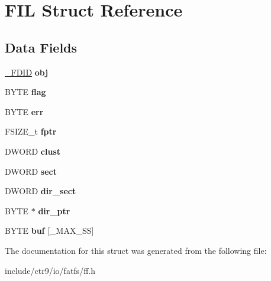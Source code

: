 \hypertarget{struct_f_i_l}{}\section{F\+IL Struct Reference}
\label{struct_f_i_l}
\subsection*{Data Fields}
\begin{DoxyCompactItemize}
\item 
\hyperlink{struct___f_d_i_d}{\+\_\+\+F\+D\+ID} {\bfseries obj}\hypertarget{struct_f_i_l_ae7242545ea88ea2602484122ebe65fa3}{}\label{struct_f_i_l_ae7242545ea88ea2602484122ebe65fa3}

\item 
B\+Y\+TE {\bfseries flag}\hypertarget{struct_f_i_l_ac409508881f5a16f2998ae675072b376}{}\label{struct_f_i_l_ac409508881f5a16f2998ae675072b376}

\item 
B\+Y\+TE {\bfseries err}\hypertarget{struct_f_i_l_aea440945db26de9c4a88065c0c887fda}{}\label{struct_f_i_l_aea440945db26de9c4a88065c0c887fda}

\item 
F\+S\+I\+Z\+E\+\_\+t {\bfseries fptr}\hypertarget{struct_f_i_l_a088b03ab2e02f82e10e17bdd938190a6}{}\label{struct_f_i_l_a088b03ab2e02f82e10e17bdd938190a6}

\item 
D\+W\+O\+RD {\bfseries clust}\hypertarget{struct_f_i_l_aa41312aba551b9a6d1c9d3c8c7d2734b}{}\label{struct_f_i_l_aa41312aba551b9a6d1c9d3c8c7d2734b}

\item 
D\+W\+O\+RD {\bfseries sect}\hypertarget{struct_f_i_l_affec18b48fe716fdae6a60123fc61145}{}\label{struct_f_i_l_affec18b48fe716fdae6a60123fc61145}

\item 
D\+W\+O\+RD {\bfseries dir\+\_\+sect}\hypertarget{struct_f_i_l_ab203794f939ad4480e81dfa488770783}{}\label{struct_f_i_l_ab203794f939ad4480e81dfa488770783}

\item 
B\+Y\+TE $\ast$ {\bfseries dir\+\_\+ptr}\hypertarget{struct_f_i_l_a5af9e9fb312b629220eaf684dd28c4a9}{}\label{struct_f_i_l_a5af9e9fb312b629220eaf684dd28c4a9}

\item 
B\+Y\+TE {\bfseries buf} \mbox{[}\+\_\+\+M\+A\+X\+\_\+\+SS\mbox{]}\hypertarget{struct_f_i_l_a7a95fb86588663e48309b5cded7e207b}{}\label{struct_f_i_l_a7a95fb86588663e48309b5cded7e207b}

\end{DoxyCompactItemize}


The documentation for this struct was generated from the following file\+:\begin{DoxyCompactItemize}
\item 
include/ctr9/io/fatfs/ff.\+h\end{DoxyCompactItemize}
